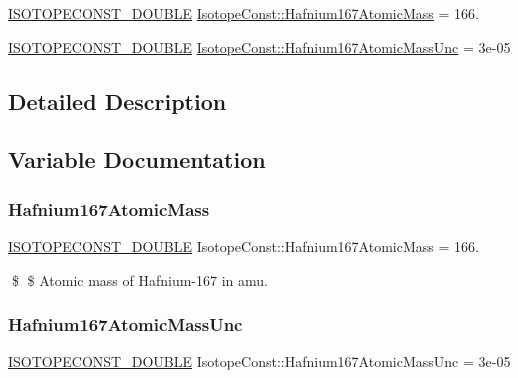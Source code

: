\begin{DoxyCompactItemize}
\item 
\mbox{\hyperlink{group___isotope_const-_macros_ga8f45a7272ce02c0b4c65c44636ed719a}{I\+S\+O\+T\+O\+P\+E\+C\+O\+N\+S\+T\+\_\+\+D\+O\+U\+B\+LE}} \mbox{\hyperlink{group___isotope_const-_hafnium-_hf167_ga443a6496a51a7e1f37d9adc5b3121ab3}{Isotope\+Const\+::\+Hafnium167\+Atomic\+Mass}} = 166.
\item 
\mbox{\hyperlink{group___isotope_const-_macros_ga8f45a7272ce02c0b4c65c44636ed719a}{I\+S\+O\+T\+O\+P\+E\+C\+O\+N\+S\+T\+\_\+\+D\+O\+U\+B\+LE}} \mbox{\hyperlink{group___isotope_const-_hafnium-_hf167_ga8c1ad05d9913e7e3afa238dfd2f82e51}{Isotope\+Const\+::\+Hafnium167\+Atomic\+Mass\+Unc}} = 3e-\/05
\end{DoxyCompactItemize}


\subsection{Detailed Description}


\subsection{Variable Documentation}
\mbox{\label{group___isotope_const-_hafnium-_hf167_ga443a6496a51a7e1f37d9adc5b3121ab3}} 
\subsubsection{\texorpdfstring{Hafnium167\+Atomic\+Mass}{Hafnium167AtomicMass}}
{\footnotesize\ttfamily \mbox{\hyperlink{group___isotope_const-_macros_ga8f45a7272ce02c0b4c65c44636ed719a}{I\+S\+O\+T\+O\+P\+E\+C\+O\+N\+S\+T\+\_\+\+D\+O\+U\+B\+LE}} Isotope\+Const\+::\+Hafnium167\+Atomic\+Mass = 166.}

\$ \$ Atomic mass of Hafnium-\/167 in amu. \mbox{\label{group___isotope_const-_hafnium-_hf167_ga8c1ad05d9913e7e3afa238dfd2f82e51}} 
\subsubsection{\texorpdfstring{Hafnium167\+Atomic\+Mass\+Unc}{Hafnium167AtomicMassUnc}}
{\footnotesize\ttfamily \mbox{\hyperlink{group___isotope_const-_macros_ga8f45a7272ce02c0b4c65c44636ed719a}{I\+S\+O\+T\+O\+P\+E\+C\+O\+N\+S\+T\+\_\+\+D\+O\+U\+B\+LE}} Isotope\+Const\+::\+Hafnium167\+Atomic\+Mass\+Unc = 3e-\/05}


